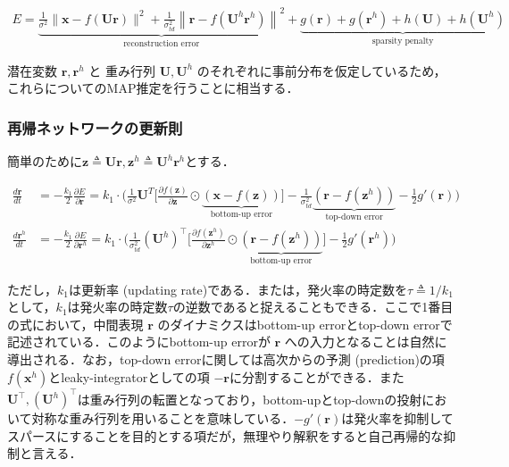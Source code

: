 \begin{align}
E=\underbrace{\frac{1}{\sigma^{2}}\|\mathbf{x}-f(\mathbf{U} \mathbf{r})\|^2+\frac{1}{\sigma_{t d}^{2}}\left\|\mathbf{r}-f(\mathbf{U}^h \mathbf{r}^h)\right\|^2}_{\text{reconstruction error}}+\underbrace{g(\mathbf{r})+g(\mathbf{r}^{h})+h(\mathbf{U})+h(\mathbf{U}^h)}_{\text{sparsity penalty}}
\end{align}


潜在変数 $\mathbf{r}, \mathbf{r}^h$ と 重み行列 $\mathbf{U}, \mathbf{U}^h$ のそれぞれに事前分布を仮定しているため，これらについてのMAP推定を行うことに相当する．

\subsubsection{再帰ネットワークの更新則}
簡単のために$\mathbf{z}\triangleq\mathbf{U}\mathbf{r}, \mathbf{z}^h\triangleq\mathbf{U}^h\mathbf{r}^h$とする．


\begin{align}
\frac{d \mathbf{r}}{d t}&=-\frac{k_{1}}{2} \frac{\partial E}{\partial \mathbf{r}}=k_{1}\cdot\Bigg(\frac{1}{\sigma^{2}} \mathbf{U}^{T}\bigg[\frac{\partial f(\mathbf{z})}{\partial \mathbf{z}}\odot\underbrace{(\mathbf{x}-f(\mathbf{z}))}_{\text{bottom-up error}}\bigg]-\frac{1}{\sigma_{t d}^{2}}\underbrace{\left(\mathbf{r}-f(\mathbf{z}^h)\right)}_{\text{top-down error}}-\frac{1}{2}g'(\mathbf{r})\Bigg)\\
\frac{d \mathbf{r}^h}{d t}&=-\frac{k_{1}}{2} \frac{\partial E}{\partial \mathbf{r}^h}=k_{1}\cdot\Bigg(\frac{1}{\sigma_{t d}^{2}}(\mathbf{U}^h)^\top\bigg[\frac{\partial f(\mathbf{z}^h)}{\partial \mathbf{z}^h}\odot\underbrace{\left(\mathbf{r}-f(\mathbf{z}^h)\right)}_{\text{bottom-up error}}\bigg]-\frac{1}{2}g'(\mathbf{r}^h)\Bigg)
\end{align}


ただし，$k_1$は更新率 (updating rate)である．または，発火率の時定数を$\tau\triangleq1/k_1$として，$k_1$は発火率の時定数$\tau$の逆数であると捉えることもできる．ここで1番目の式において，中間表現 $\mathbf{r}$ のダイナミクスはbottom-up errorとtop-down errorで記述されている．このようにbottom-up errorが $\mathbf{r}$ への入力となることは自然に導出される．なお，top-down errorに関しては高次からの予測 (prediction)の項 $f(\mathbf{x}^h)$とleaky-integratorとしての項 $-\mathbf{r}$に分割することができる．また$\mathbf{U}^\top, (\mathbf{U}^h)^\top$は重み行列の転置となっており，bottom-upとtop-downの投射において対称な重み行列を用いることを意味している．$-g'(\mathbf{r})$は発火率を抑制してスパースにすることを目的とする項だが，無理やり解釈をすると自己再帰的な抑制と言える．

